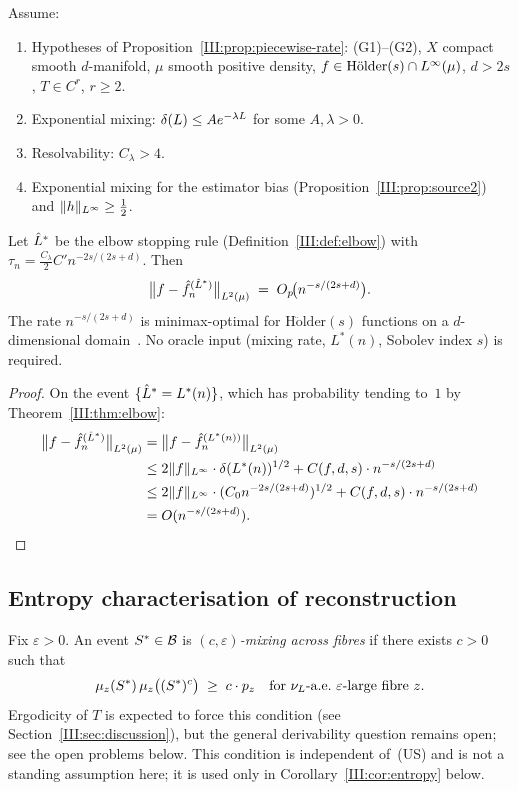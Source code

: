 \begin{theorem}
\label{III:thm:algebra}
Assume:
\begin{enumerate}[label=(\roman*)]
  \item Hypotheses of Proposition~\ref{III:prop:piecewise-rate}:
    (G1)--(G2), $X$ compact smooth $d$-manifold, $\mu$ smooth positive density,
    $f \in \mathrm{H\ddot{o}lder}(s) \cap L^{\infty}(\mu)$, $d > 2s$, $T \in C^r$, $r \geq 2$.
  \item Exponential mixing: $\delta(L) \leq A e^{-\lambda L}$ for some $A, \lambda > 0$.
  \item Resolvability: $C_\lambda > 4$.
  \item Exponential mixing for the estimator bias (Proposition~\ref{III:prop:source2})
    and $\|h\|_{L^{\infty}} \geq \frac{1}{2}$.
\end{enumerate}
Let $\hat{L}^*$ be the elbow stopping rule (Definition~\ref{III:def:elbow}) with
$\tau_n = \frac{C_\lambda}{2} C' n^{-2s/(2s+d)}$.
Then
\[
  \bigl\|f - \hat{f}_n^{(\hat{L}^*)}\bigr\|_{L^{2}(\mu)}
  \;=\; O_p\!\bigl(n^{-s/(2s+d)}\bigr).
\]
The rate $n^{-s/(2s+d)}$ is minimax-optimal for $\mathrm{H\ddot{o}lder}(s)$
functions on a $d$-dimensional domain~\cite{Stone1982}.
No oracle input (mixing rate, $L^*(n)$, Sobolev index $s$) is required.
\end{theorem}

\begin{proof}
On the event $\{\hat{L}^* = L^*(n)\}$, which has probability tending to~$1$ by
Theorem~\ref{III:thm:elbow}:
\begin{align*}
  \bigl\|f - \hat{f}_n^{(\hat{L}^*)}\bigr\|_{L^{2}(\mu)}
  &= \bigl\|f - \hat{f}_n^{(L^*(n))}\bigr\|_{L^{2}(\mu)} \\
  &\leq 2\|f\|_{L^{\infty}} \cdot \delta(L^*(n))^{1/2}
    + C(f,d,s) \cdot n^{-s/(2s+d)} \\
  &\leq 2\|f\|_{L^{\infty}} \cdot (C_0 n^{-2s/(2s+d)})^{1/2}
    + C(f,d,s) \cdot n^{-s/(2s+d)} \\
  &= O(n^{-s/(2s+d)}). \qedhere
\end{align*}
\end{proof}

\subsection{Entropy characterisation of reconstruction}
\label{III:subsec:entropy}

\begin{definition}
\label{III:def:fibre-mixing}
Fix $\varepsilon > 0$.
An event $S^* \in \mathcal{B}$ is \emph{$(c,\varepsilon)$-mixing across fibres} if
there exists $c > 0$ such that
\[
  \mu_z(S^*)\,\mu_z\bigl((S^*)^c\bigr) \;\geq\; c\cdot p_z
  \quad\text{for $\nu_L$-a.e.\ $\varepsilon$-large fibre } z.
\]
Ergodicity of $T$ is expected to force this condition (see
Section~\ref{III:sec:discussion}), but the general derivability question remains
open; see the open problems below.
This condition is independent of~(US) and is not a standing assumption here;
it is used only in Corollary~\ref{III:cor:entropy} below.
\end{definition}

